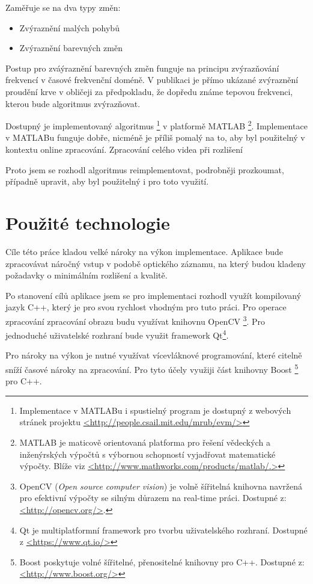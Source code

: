 \documentclass[
  digital, %
  table,   %
%
  lof,     %
  lot,     %
]{fithesis3}
\begin{document}
Zaměřuje se na dva typy změn:
\begin{itemize}
	\item Zvýraznění malých pohybů
    \item Zvýraznění barevných změn
\end{itemize}

Postup pro zváýraznění barevných změn funguje na principu zvýrazňování frekvencí v časové frekvenční doméně.
V publikaci je přímo ukázané zvýraznění proudění krve v obličeji za předpokladu, že dopředu známe tepovou frekvenci, kterou bude algoritmus zvýrazňovat.

Dostupný je implementovaný algoritmus
\footnote{Implementace v MATLABu i spustielný program je dostupný z webových stránek projektu \url{<http://people.csail.mit.edu/mrub/evm/>}}
v platformě MATLAB
\footnote{MATLAB je maticově orientovaná platforma pro řešení vědeckých a inženýrských výpočtů s výbornou schopností vyjadřovat matematické výpočty. Blíže viz \url{<http://www.mathworks.com/products/matlab/.>}}.
Implementace v MATLABu funguje dobře, nicméně je příliš pomalý na to, aby byl použitelný v kontextu online zpracování. Zpracování celého videa při rozlišení

Proto jsem se rozhodl algoritmus reimplementovat, podrobněji prozkoumat, případně upravit, aby byl použitelný i pro toto využití.

\chapter{Použité technologie}
Cíle této práce kladou velké nároky na výkon implementace. Aplikace bude zpracovávat náročný vstup v podobě optického záznamu, na který budou kladeny požadavky o minimálním rozlišení a kvalitě.

Po stanovení cílů aplikace jsem se pro implementaci rozhodl využít kompilovaný jazyk C++, který je pro svou rychlost vhodným pro tuto práci. Pro operace zpracování zpracování obrazu budu využívat knihovnu OpenCV
\footnote{OpenCV (\emph{Open source computer vision}) je volně šířitelná knihovna navržená pro efektivní výpočty se silným důrazem na real-time práci. Dostupné z: \url{<http://opencv.org/>}.}.
Pro jednoduché uživatelské rozhraní bude využit framework Qt\footnote{Qt je multiplatformní framework pro tvorbu uživatelského rozhraní. Dostupné z \url{<https://www.qt.io/>}}.

Pro nároky na výkon je nutné využívat vícevláknové programování, které citelně sníží časové nároky na zpracování. Pro tyto účely využiji část knihovny Boost
\footnote{Boost poskytuje volné šířitelné, přenositelné knihovny pro C++. Dostupné z: \url{<http://www.boost.org/>}}
pro C++.
\end{document}
